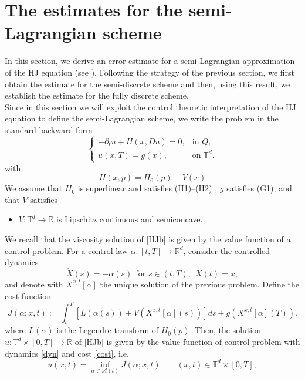 \documentclass[11pt]{amsart}
\theoremstyle{remark}
\theoremstyle{definition}
\theoremstyle{Claim}
\newcommand{\T}{{\mathbb{T}}}
\newcommand{\R}{\mathbb{R}}
\theoremstyle{plain}
\begin{document}
\section{The estimates for the semi-Lagrangian scheme}\label{sec:semi_lagrangian}
In this section, we derive an error estimate for a semi-Lagrangian approximation of the HJ equation (see \cite{csl,cdi,ff,g}). Following the strategy of the previous section, we first obtain the estimate for the semi-discrete scheme and then, using this result, we establish the estimate for the fully discrete scheme.\\
Since in this section we will exploit the control theoretic interpretation of the HJ equation to define the semi-Lagrangian scheme, we write the problem in the standard backward form
\begin{equation}\label{HJb}
	\begin{cases}
		-\partial_t u + H(x,Du) = 0, & \text{in }Q,\\[4pt]
		u(x,T)=g(x), & \text{on }\mathbb{T}^d.
	\end{cases}
\end{equation}
with 
\begin{equation}\label{Ham_separata}
	H(x,p)=H_0(p)-V(x)
\end{equation}
We assume that $H_0$ is superlinear and satisfies \textup{(H1)--(H2)} , $g$ satisfies \textup{(G1)}, and that $V$ satisfies
\begin{itemize}
	\item[(V1)] $V:\T^d\to\R$ is Lipschitz continuous and semiconcave.
\end{itemize}
We recall that the viscosity solution of \eqref{HJb} is given by the value function of a control problem. 
For a control law $\alpha:[t,T]\to\R^d$, consider the controlled dynamics
\begin{equation}\label{dyn} 
	\dot X(s)=-\alpha(s) \ \ \mbox{for } s\in (t,T), \ \  X(t)=x,
\end{equation}
and denote with $X^{x,t}[\alpha]$  the unique solution of the previous problem. Define the  cost function
\begin{equation}\label{cost}
	J(\alpha;x,t):=\int_t^T [ L( \alpha(s))+V(X^{x,t}[\alpha](s))]ds +g(X^{x,t}[\alpha](T)).
\end{equation}
where $L(\alpha)$ is the Legendre transform of $H_{0}(p)$. 
Then, the solution   $u:\T^d\times [0,T]\to \R $ of \eqref{HJb} is given by the value function  of  control problem with dynamics \eqref{dyn}  and cost \eqref{cost}, i.e.
\begin{equation}\label{value}
	u(x,t)=\inf_{\alpha \in \mathcal{A}(t)} J(\alpha;x,t) \qquad (x,t) \in  \T^d\times [0,T],
\end{equation}
\end{document}
